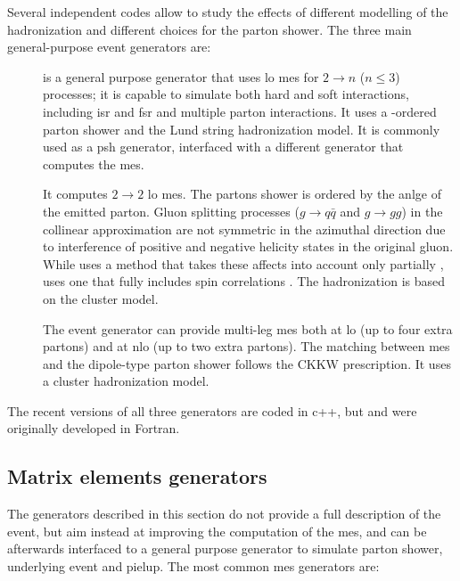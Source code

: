 Several independent codes allow to study the effects of different modelling of the hadronization and different choices for the parton shower. The three main general-purpose event generators are:

\begin{description}
\item[\PY] \cite{Sjostrand:2006za,Sjostrand:2014zea} \PY is a general purpose generator that uses \gls{lo} \glspl{me} for $2\rightarrow n $ ($n \leq 3$) processes; 
it is capable to simulate both hard and soft interactions, including \gls{isr} and \gls{fsr} and multiple parton interactions.
It uses a \pt-ordered parton shower and the Lund string hadronization model. It is commonly used as a \gls{psh} generator, interfaced with a different generator that computes the \glspl{me}.

\item[\HW] \cite{Corcella:2000bw,Bahr:2008pv,Bellm:2015jjp} It computes $2\rightarrow 2$ \gls{lo} \glspl{me}.
 The partons shower is ordered by the anlge of the emitted parton. Gluon splitting processes ($g \rightarrow q\bar{q}$ and $g \rightarrow gg$) in the collinear approximation are not symmetric in the azimuthal direction due to interference of positive and negative helicity states in the original gluon. 
While \PY uses a method that takes these affects into account only partially \cite{Webber:1987uy}, \HW uses one that fully includes spin correlations \cite{Collins:1987cp}. The hadronization is based on the cluster model.

\item[\Sherpa] \cite{Gleisberg:2008ta} The \Sherpa event generator can provide multi-leg \glspl{me} both at \gls{lo} (up to four extra partons) and at \gls{nlo} (up to two extra partons). 
The matching between \glspl{me} and the dipole-type parton shower \cite{Schumann:2007mg} follows the CKKW prescription.
It uses a cluster hadronization model. 

\end{description}

The recent versions of all three generators are coded in c++, but \HW and \PY were originally developed in Fortran.  

\subsection{Matrix elements generators}

The generators described in this section do not provide a full description of the event, but aim instead at improving the 
computation of the \glspl{me}, and can be afterwards interfaced to a general purpose generator to simulate parton shower, underlying event and pielup. The most common \glspl{me} generators are:

